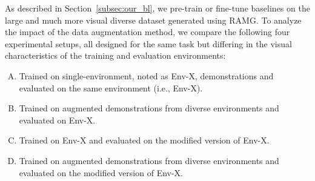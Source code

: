 


As described in Section~\ref{subsec:our_bl}, we pre-train or fine-tune baselines on the large and much more visual diverse dataset generated using RAMG. To analyze the impact of the data augmentation method, we compare the following four experimental setups, all designed for the same task but differing in the visual characteristics of the training and evaluation environments:
\begin{enumerate}[A.] 
    \item Trained on single-environment, noted as Env-X, demonstrations and evaluated on the same environment (i.e., Env-X). 
    \item Trained on augmented demonstrations from diverse environments and evaluated on Env-X. 
    \item Trained on Env-X and evaluated on the modified version of Env-X. 
    \item Trained on augmented demonstrations from diverse environments and evaluated on the modified version of Env-X. 
\end{enumerate} 

